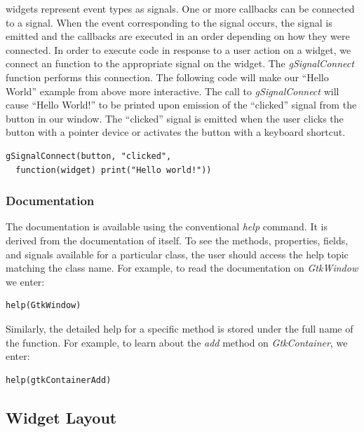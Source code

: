 \documentclass[article]{jss}
\begin{document}
 widgets represent event types as signals. One or more
callbacks can be connected to a signal. When the event corresponding to the
signal occurs, the signal is emitted and the callbacks are executed in an order
depending on how they were connected. In order to execute  code in 
response to a user action on a widget, we connect an  function to the 
appropriate signal on the widget.  The \emph{gSignalConnect} function 
performs this connection. The following code will make our ``Hello World'' 
example from above more interactive.
The call to \emph{gSignalConnect} will cause ``Hello World!'' to be printed 
upon emission of the ``clicked'' signal from the button in our window. The 
``clicked'' signal is emitted when the user clicks the button with a pointer
device or activates the button with a keyboard shortcut.
\begin{verbatim}
gSignalConnect(button, "clicked", 
  function(widget) print("Hello world!"))
\end{verbatim}

\subsubsection{Documentation}

The  documentation is available using the conventional  
\emph{help} command. It is derived from the documentation of  itself.
To see the methods, properties, fields, and signals available
for a particular class, the user should access the help topic matching the class name.
For example, to read the documentation on \emph{GtkWindow} we enter:
\begin{verbatim}
help(GtkWindow)
\end{verbatim}

Similarly, the detailed help for a specific method is stored under the full
name of the function. For example, to learn about the \emph{add} method on
\emph{GtkContainer}, we enter:
\begin{verbatim}
help(gtkContainerAdd)
\end{verbatim}

\subsection{Widget Layout}\label{sec:layout}
\end{document}
